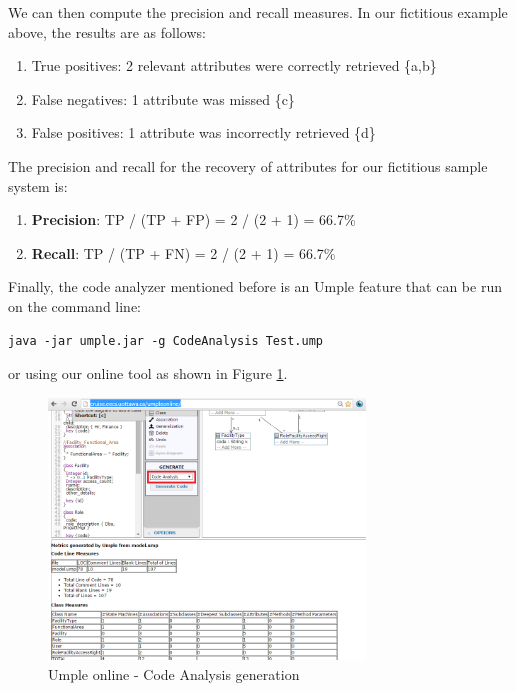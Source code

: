 We can then compute the precision and recall measures. In our fictitious example above, the results are as follows:

\begin{enumerate}
\item True positives: 2 relevant attributes were correctly retrieved \{a,b\}
\item False negatives:  1 attribute was missed \{c\}
\item False positives: 1 attribute was incorrectly retrieved \{d\}
\end{enumerate}

The precision and recall for the recovery of attributes for our fictitious sample system is:


\begin{enumerate}
\item \textbf{Precision}: TP / (TP + FP) = 2 / (2 + 1) = 66.7\%
\item \textbf{Recall}: TP / (TP + FN) =  2 / (2 + 1) = 66.7\%
\end{enumerate}

Finally, the code analyzer mentioned before is an Umple feature that can be run on the command line:

\vspace{\baselineskip}
\begin{lstlisting}[style=umplePlain]
   java -jar umple.jar -g CodeAnalysis Test.ump
\end{lstlisting}
or using our online tool as shown in Figure \ref{fig:onlineCodeAnalyzer}.

\begin{figure}[h]
\centering
\includegraphics[width=0.75\textwidth]{Figures/UmpleOnlineCodeAnalyzer.png} 
\caption{Umple online - Code Analysis generation}
\label{fig:onlineCodeAnalyzer}
\end{figure}

